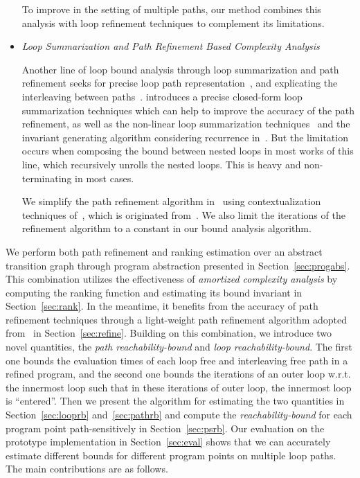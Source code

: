 \begin{itemize}
  To improve in the setting of multiple paths, our method combines this analysis with loop refinement techniques to complement its limitations.
\item
\emph{Loop Summarization and Path Refinement Based Complexity Analysis}

Another line of loop bound analysis through loop summarization and path refinement seeks for precise loop path representation~\cite{ManoliosV06,BalakrishnanSIG09,SharmaDDA11,Flores-MontoyaH14,HumenbergerJK18,CyphertBKR19}, and explicating the interleaving between paths~\cite{GulwaniJK09,ZulegerGSV11}.
\cite{KincaidBCR19} introduces a precise closed-form loop summarization techniques which can help to improve the accuracy of the path refinement, as well as the non-linear loop summarization techniques~\cite{KincaidCBR18} and the invariant generating algorithm considering recurrence in~\cite{BreckCKR20}. 
But the limitation occurs when composing the bound between nested loops in most works of this line, which recursively unrolls the nested loops. This is heavy and non-terminating in most cases.

We simplify the path refinement algorithm in~\cite{GulwaniJK09} using contextualization techniques of~\cite{ZulegerGSV11,SinnZV14}, which is originated from~\cite{ManoliosV06}.
We also limit the iterations of the refinement algorithm to a constant in our bound analysis algorithm.
\end{itemize}
%
We perform both path refinement and ranking estimation over an abstract transition graph through program abstraction presented in Section~\ref{sec:progabs}.
This combination utilizes the effectiveness of \emph{amortized complexity analysis} by computing the ranking function
and estimating its bound invariant in Section~\ref{sec:rank}.
In the meantime, it benefits from the accuracy of path refinement techniques through a light-weight path refinement algorithm adopted from~\cite{GulwaniJK09} in Section~\ref{sec:refine}.
Building on this combination, we introduce two novel quantities,
the \emph{path reachability-bound} and \emph{loop reachability-bound}.
The first one bounds the evaluation times of each loop free and interleaving free path in a refined program, and the second one bounds the iterations of an outer loop w.r.t. the innermost loop such that in these iterations of outer loop, the innermost loop is ``entered''. 
Then we present the algorithm for estimating the two quantities in Section~\ref{sec:looprb} and~\ref{sec:pathrb} and compute the \emph{reachability-bound} for each program point path-sensitively in Section~\ref{sec:psrb}.
Our evaluation on the prototype implementation in Section~\ref{sec:eval} shows that we can accurately estimate different bounds for different program points on multiple loop paths. The main contributions are as follows.

